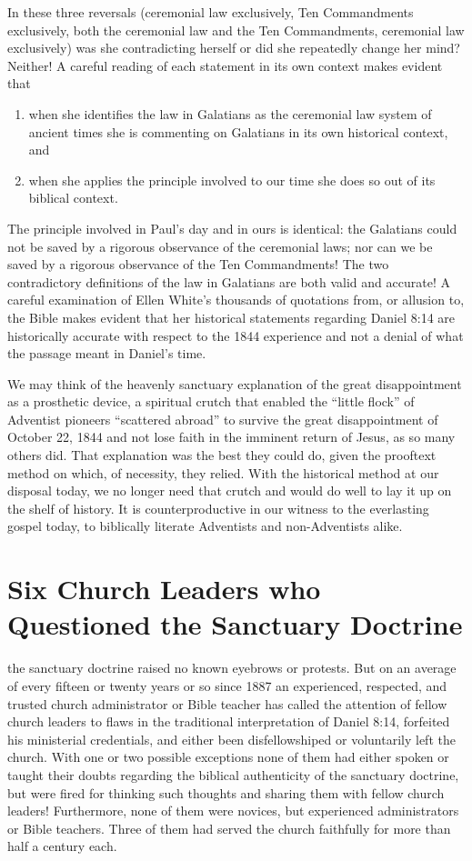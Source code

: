 In these three reversals (ceremonial law exclusively, Ten Commandments
exclusively, both the ceremonial law and the Ten Commandments, ceremonial
law exclusively) was she contradicting herself or did she repeatedly change
her mind? Neither! A careful reading of each statement in its own context
makes evident that
\begin{enumerate}
        \item when she identifies the law in Galatians as the
ceremonial law system of ancient times she is commenting on Galatians in its
own historical context, and 
        \item when she applies the principle involved to
our time she does so out of its biblical context.
\end{enumerate}
The principle involved in
Paul's day and in ours is identical: the Galatians could not be saved by a
rigorous observance of the ceremonial laws; nor can we be saved by a
rigorous observance of the Ten Commandments! The two contradictory
definitions of the law in Galatians are both valid and accurate! A careful
examination of Ellen White's thousands of quotations from, or allusion to,
the Bible makes evident that her historical statements regarding Daniel 8:14
are historically accurate with respect to the 1844 experience and not a
denial of what the passage meant in Daniel's time. 

We may think of the heavenly sanctuary explanation of the great
disappointment as a prosthetic device, a spiritual crutch that enabled the
``little flock'' of Adventist pioneers ``scattered abroad'' to survive the
great disappointment of October 22, 1844 and not lose faith in the imminent
return of Jesus, as so many others did. That explanation was the best they
could do, given the prooftext method on which, of necessity, they relied.
With the historical method at our disposal today, we no longer need that
crutch and would do well to lay it up on the shelf of history. It is
counterproductive in our witness to the everlasting gospel today, to
biblically literate Adventists and non-Adventists alike. 

\chapter{Six Church Leaders who Questioned the Sanctuary Doctrine}
\label{ch:six}

 the sanctuary doctrine raised no known eyebrows or
protests. But on an average of every fifteen or twenty years or so since
1887 an experienced, respected, and trusted church administrator or Bible
teacher has called the attention of fellow church leaders to flaws in the
traditional interpretation of Daniel 8:14, forfeited his ministerial
credentials, and either been disfellowshiped or voluntarily left the church.
With one or two possible exceptions none of them had either spoken or taught
their doubts regarding the biblical authenticity of the sanctuary doctrine,
but were fired for thinking such thoughts and sharing them with fellow
church leaders! Furthermore, none of them were novices, but experienced
administrators or Bible teachers. Three of them had served the church
faithfully for more than half a century each.

